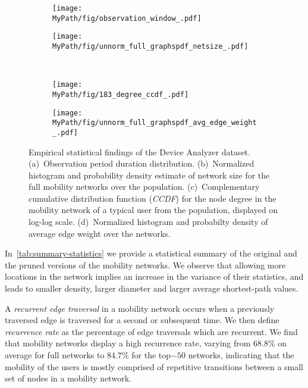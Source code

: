 \begin{figure*}[!t]
	\centering
	\begin{subfigure}[!t]{0.47\textwidth}
		\centering		\texttt{[image: \\MyPath/fig/observation\_window\_.pdf]}
		\caption{}
		\label{fig:num_of_days}
	\end{subfigure}%
	\begin{subfigure}[!t]{.47\textwidth}
		\centering
		\texttt{[image: \\MyPath/fig/unnorm\_full\_graphspdf\_netsize\_.pdf]}
		\caption{}
		\label{fig:sizes}
	\end{subfigure}%
	\\
	\begin{subfigure}[!t]{0.47\textwidth}
		\centering
		\texttt{[image: \\MyPath/fig/183\_degree\_ccdf\_.pdf]}
		\caption{}
		\label{fig:ccdf}
	\end{subfigure}
	\begin{subfigure}[!t]{0.47\textwidth}
		\centering
		\texttt{[image: \\MyPath/fig/unnorm\_full\_graphspdf\_avg\_edge\_weight\_.pdf]}
		\caption{}
		\label{fig:avg_edge_weight}
	\end{subfigure}
	\caption{Empirical statistical findings of the Device Analyzer dataset. (a)~Observation period duration distribution. (b)~Normalized histogram and probability density estimate of network size for the full mobility networks over the population. (c)~Complementary cumulative distribution function (\emph{CCDF}) for the node degree in the mobility network of a typical user from the population, displayed on log-log scale. (d)~Normalized histogram and probabilty density of average edge weight over the networks.}
	\label{fig:eda}
\end{figure*}

In~\cref{tab:summary-statistics} we provide a statistical summary of the original and the pruned versions of the mobility networks. We observe that allowing more locations in the network implies an increase in the variance of their statistics, and leads to smaller density, larger diameter and larger average shortest-path values.

A \emph{recurrent edge traversal} in a mobility network occurs when a previously traversed edge is traversed for a second or subsequent time.
We then define \emph{recurrence rate} as the percentage of edge traversals which are recurrent.
We find that mobility networks display a high recurrence rate, varying from  $68.8\%$ on average for full networks to $84.7\% $ for the top$-50$ networks, indicating that the mobility of the users is mostly comprised of repetitive transitions between a small set of nodes in a mobility network.

